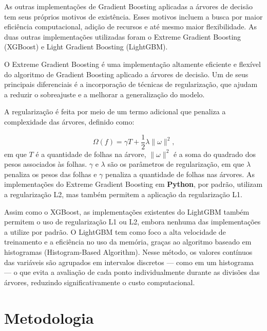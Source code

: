 \documentclass[
  12pt,
  a4paper,
]{scrreprt}
\begin{document}
\vspace{12pt}

As outras implementações de Gradient Boosting aplicadas a árvores de
decisão tem seus próprios motivos de existência. Esses motivos incluem a
busca por maior eficiência computacional, adição de recursos e até mesmo
maior flexibilidade. As duas outras implementações utilizadas foram o
Extreme Gradient Boosting (XGBoost) e Light Gradient Boosting
(LightGBM).

\vspace{12pt}

O Extreme Gradient Boosting é uma implementação altamente eficiente e
flexível do algoritmo de Gradient Boosting aplicado a árvores de
decisão. Um de seus principais diferenciais é a incorporação de técnicas
de regularização, que ajudam a reduzir o sobreajuste e a melhorar a
generalização do modelo.

\vspace{12pt}

A regularização é feita por meio de um termo adicional que penaliza a
complexidade das árvores, definido como:

\[
\Omega\left(f\right) = \gamma T + \frac{1}{2}\lambda\|\omega\|^{2}\text{,}
\] em que \(T\) é a quantidade de folhas na árvore, \(\|\omega\|^{2}\) é
a soma do quadrado dos pesos associados às folhas. \(\gamma\) e
\(\lambda\) são os parâmetros de regularização, em que \(\lambda\)
penaliza os pesos das folhas e \(\gamma\) penaliza a quantidade de
folhas nas árvores. As implementações do Extreme Gradient Boosting em
\textbf{Python}, por padrão, utilizam a regularização L2, mas também
permitem a aplicação da regularização L1.

\vspace{12pt}

Assim como o XGBoost, as implementações existentes do LightGBM também
permitem o uso de regularização L1 ou L2, embora nenhuma das
implementações a utilize por padrão. O LightGBM tem como foco a alta
velocidade de treinamento e a eficiência no uso da memória, graças ao
algoritmo baseado em histogramas (Histogram-Based Algorithm). Nesse
método, os valores contínuos das variáveis são agrupados em intervalos
discretos --- como em um histograma --- o que evita a avaliação de cada
ponto individualmente durante as divisões das árvores, reduzindo
significativamente o custo computacional.

\chapter{Metodologia}\label{metodologia}
\end{document}
